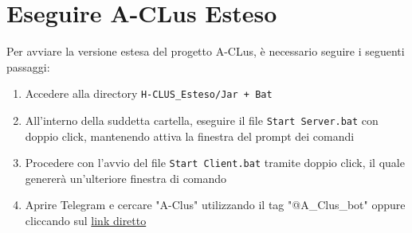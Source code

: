 
\section{Eseguire A-CLus Esteso}


Per avviare la versione estesa del progetto A-CLus, è necessario seguire i seguenti passaggi:
\begin{enumerate}
    \item Accedere alla directory \texttt{H-CLUS\_Esteso/Jar + Bat}
    \item All'interno della suddetta cartella, eseguire il file \texttt{Start Server.bat} con doppio click, mantenendo attiva la finestra del prompt dei comandi
    \item Procedere con l'avvio del file \texttt{Start Client.bat} tramite doppio click, il quale genererà un'ulteriore finestra di comando
    \item Aprire Telegram e cercare "A-Clus" utilizzando il tag "@A\_Clus\_bot" oppure cliccando sul \href{https://shorturl.at/r07hj}{link diretto}
\end{enumerate}


